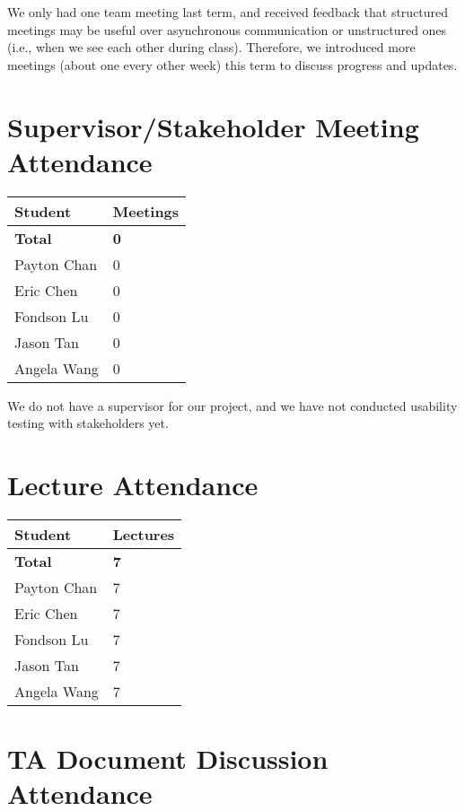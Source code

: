 \documentclass{article}
\begin{document}
We only had one team meeting last term, and received feedback that structured
meetings may be useful over asynchronous communication or unstructured ones
(i.e., when we see each other during class). Therefore, we introduced more
meetings (about one every other week) this term to discuss progress and updates.

\section{Supervisor/Stakeholder Meeting Attendance}

\begin{table}[H]
    \centering
    \begin{tabular}{ll}
    \toprule
    \textbf{Student} & \textbf{Meetings}\\
    \midrule
    \textbf{Total} & \textbf{0}\\
    Payton Chan & 0\\
    Eric Chen & 0\\
    Fondson Lu & 0\\
    Jason Tan & 0\\
    Angela Wang & 0\\
    \bottomrule
    \end{tabular}
    \end{table}
    
We do not have a supervisor for our project, and we have not conducted usability
testing with stakeholders yet.

\section{Lecture Attendance}

\begin{table}[H]
    \centering
    \begin{tabular}{ll}
    \toprule
    \textbf{Student} & \textbf{Lectures}\\
    \midrule
    \textbf{Total} & \textbf{7}\\
    Payton Chan & 7\\
    Eric Chen & 7\\
    Fondson Lu & 7\\
    Jason Tan & 7\\
    Angela Wang & 7\\
    \bottomrule
    \end{tabular}
\end{table}

\section{TA Document Discussion Attendance}
\end{document}
